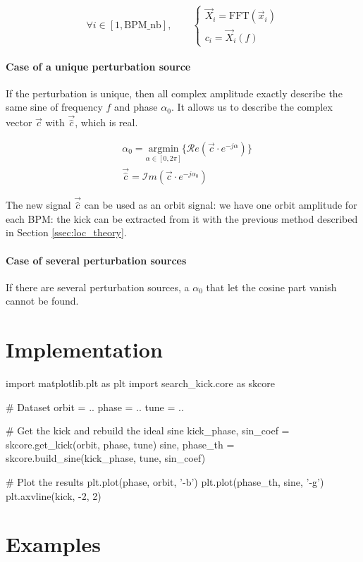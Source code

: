 \begin{equation}
\forall i \in [1, \mathrm{BPM\_nb}], \qquad 
\begin{cases}
\vec{X}_i = \mathrm{FFT}(\vec{x}_i) \\
c_i = \vec{X}_i(f)
\end{cases}
\end{equation}

\paragraph{Case of a unique perturbation source}

If the perturbation is unique, then all complex amplitude exactly describe the same sine of frequency $f$ and phase $\alpha_0$. It allows us to describe the complex vector $\vec{c}$ with $\vec{\hat{c}}$, which is real.

\begin{align}
&\alpha_0 = \underset{\alpha \in [0, 2\pi]}{\textrm{argmin}}\{\mathcal{R}e (\vec{c} \cdot e^{-j\alpha}) \} \\
&\vec{\hat{c}} = \mathcal{I}m (\vec{c} \cdot e^{-j\alpha_0})
\end{align}

The new signal $\vec{\hat{c}}$ can be used as an orbit signal: we have one orbit amplitude for each BPM: the kick can be extracted from it with the previous method described in Section \ref{ssec:loc_theory}.


\paragraph{Case of several perturbation sources}
If there are several perturbation sources, a $\alpha_0$ that let the cosine part vanish cannot be found. 


\section{Implementation}
\begin{python}[caption=Get the kick]
	import matplotlib.plt as plt
	import search_kick.core as skcore
	
	# Dataset
	orbit = ..
	phase = ..
	tune = ..
	
	# Get the kick and rebuild the ideal sine
	kick_phase, sin_coef = skcore.get_kick(orbit, phase, tune)
	sine, phase_th = skcore.build_sine(kick_phase, tune, sin_coef)
	
	# Plot the results
	plt.plot(phase, orbit, '-b')
	plt.plot(phase_th, sine, '-g')
	plt.axvline(kick, -2, 2)	
\end{python}


\section{Examples}

